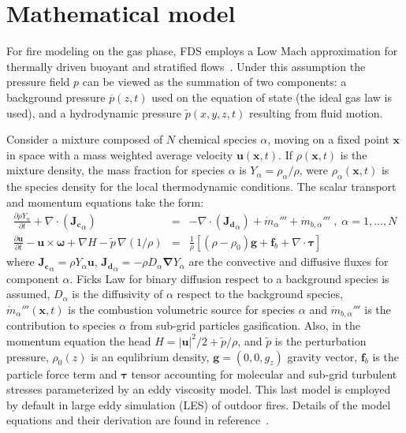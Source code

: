 \documentclass[journal,article,atmosphere,submit,moreauthors,pdftex]{Definitions/mdpi}
\begin{document}
\section{Mathematical model} \label{sec:matmodel}

For fire modeling on the gas phase, FDS employs a Low Mach approximation for thermally driven buoyant and stratified flows~\cite{Rehm:1}. Under this assumption the pressure field $p$ can be viewed as the summation of two components: a background pressure $\overline{p}(z,t)$ used on the equation of state (the ideal gas law is used), and a hydrodynamic pressure $\tilde{p}(x,y,z,t)$ resulting from fluid motion.

Consider a mixture composed of $N$ chemical species $\alpha$, moving on a fixed point $\mathbf{x}$ in space with a mass weighted average velocity $\mathbf{u}(\mathbf{x},t)$. If $\rho(\mathbf{x},t)$ is the mixture density, the mass fraction for species $\alpha$ is $Y_\alpha = \rho_\alpha / \rho$, were $\rho_\alpha(\mathbf{x},t)$ is the species density for the local thermodynamic conditions. The scalar transport and momentum equations take the form:
\begin{eqnarray}
   \frac{\partial \rho Y_\alpha}{ \partial t} + \nabla \cdot ( \mathbf{J_{c}}_\alpha ) &=& - \nabla \cdot (\mathbf{J_{d}}_\alpha) + \dot{m}_\alpha'''  + 
    \dot{m}_{b,\alpha}'''\; , \; \alpha=1,\dots,N \label{eqn:spectran} \\
    \frac{\partial \mathbf{u}}{\partial t} - \mathbf{u} \times \boldsymbol{\omega} + \nabla H - \tilde{p} \, \nabla \left( 1/\rho\right) &=&
    \frac{1}{\rho} \left[ (\rho-\rho_0) \mathbf{g} + \mathbf{f}_{b} + \nabla \cdot \boldsymbol{\tau} \right] \label{eqn:momtran}
\end{eqnarray}
where $\mathbf{J_{c}}_\alpha=\rho Y_\alpha  \mathbf{u}$, $\mathbf{J_{d}}_\alpha=- \rho D_\alpha \boldsymbol{\nabla} Y_\alpha$ are the convective and diffusive fluxes for component $\alpha$. Ficks Law for binary diffusion respect to a background species is assumed, $D_\alpha$ is the diffusivity of $\alpha$ respect to the background species, $\dot{m}_\alpha'''(\mathbf{x},t)$ is the combustion volumetric source for species $\alpha$ and $ \dot{m}_{b,\alpha}'''$ is the contribution to species $\alpha$ from sub-grid particles gasification. Also, in the momentum equation the head $H=|\mathbf{u}|^2/2 + \tilde{p}/\rho$, and $\tilde{p}$ is the perturbation pressure, $\rho_0(z)$ is an equlibrium density, $\mathbf{g}=(0,0,g_z)$ gravity vector, $\mathbf{f}_{b}$ is the particle force term and $\boldsymbol{\tau}$ tensor accounting for molecular and sub-grid turbulent stresses parameterized by an eddy viscosity model. This last model is employed by default in large eddy simulation (LES) of outdoor fires. Details of the model equations and their derivation are found in reference~\cite{mcgratta_2013tr}.
\end{document}

